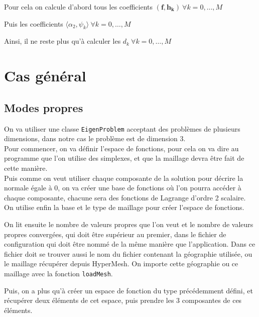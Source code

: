 Pour cela on calcule d'abord tous les coefficients $(\bm{f},\bm{h_k})\ \forall k=0,\dots,M$


Puis les coefficients $\langle\alpha_2,\psi_k\rangle\ \forall k=0,\dots,M$


Ainsi, il ne reste plus qu'à calculer les $d_k\ \forall k=0,\dots,M$


\section{Cas général}

\subsection{Modes propres}

\iffalse

On va utiliser une classe \texttt{EigenProblem} acceptant des problèmes de plusieurs dimensions, dans notre cas le problème est de dimension 3.\\
Pour commencer, on va définir l'espace de fonctions, pour cela on va dire au programme que l'on utilise des simplexes, et que la maillage devra être fait de cette manière.\\
Puis comme on veut utiliser chaque composante de la solution pour décrire la normale égale à 0, on va créer une base de fonctions où l'on pourra accéder à chaque composante, chacune sera des fonctions de Lagrange d'ordre 2 scalaire.\\
On utilise enfin la base et le type de maillage pour créer l'espace de fonctions.



On lit ensuite le nombre de valeurs propres que l'on veut et le nombre de valeurs propres convergées, qui doit être supérieur au premier, dans le fichier de configuration qui doit être nommé de la même manière que l'application. Dans ce fichier doit se trouver aussi le nom du fichier contenant la géographie utilisée, ou le maillage récupérer depuis HyperMesh. On importe cette géographie ou ce maillage avec la fonction \texttt{loadMesh}.



Puis, on a plus qu'à créer un espace de fonction du type précédemment défini, et récupérer deux éléments de cet espace, puis prendre les 3 composantes de ces éléments.

